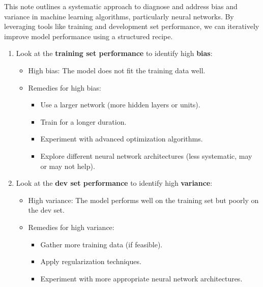 \documentclass[letterpaper,12pt,notitlepage,twoside]{report}
\begin{document}
This note outlines a systematic approach to diagnose and address bias and variance in machine learning algorithms, particularly neural networks. By leveraging tools like training and development set performance, we can iteratively improve model performance using a structured recipe.
\begin{enumerate}
    \item Look at the \textbf{training set performance} to identify high \textbf{bias}:
    \begin{itemize}
        \item High bias: The model does not fit the training data well.
        \item Remedies for high bias:
        \begin{itemize}
            \item Use a larger network (more hidden layers or units).
            \item Train for a longer duration.
            \item Experiment with advanced optimization algorithms.
            \item Explore different neural network architectures (less systematic, may or may not help).
        \end{itemize}
    \end{itemize}
    \item Look at the \textbf{dev set performance} to identify high \textbf{variance}:
    \begin{itemize}
        \item High variance: The model performs well on the training set but poorly on the dev set.
        \item Remedies for high variance:
        \begin{itemize}
            \item Gather more training data (if feasible).
            \item Apply regularization techniques.
            \item Experiment with more appropriate neural network architectures.
        \end{itemize}
    \end{itemize}
\end{enumerate}
\end{document}
